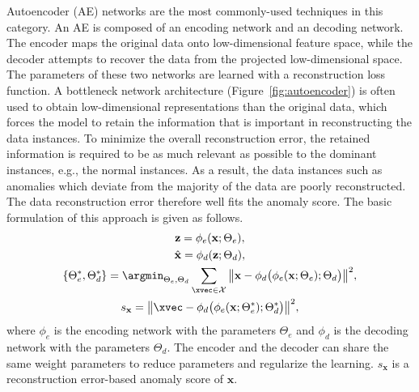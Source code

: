 Autoencoder (AE) networks are the most commonly-used techniques in this category. An AE is composed of an encoding network and an decoding network. The encoder maps the original data onto low-dimensional feature space, while the decoder attempts to recover the data from the projected low-dimensional space. The parameters of these two networks are learned with a reconstruction loss function. A bottleneck network architecture (Figure~\ref{fig:autoencoder}) is often used to obtain low-dimensional representations than the original data, which forces the model to retain the information that is important in reconstructing the data instances. To minimize the overall reconstruction error, the retained information is required to be as much relevant as possible to the dominant instances, e.g., the normal instances. As a result, the data instances such as anomalies which deviate from the majority of the data are poorly reconstructed. The data reconstruction error therefore well fits the anomaly score. The basic formulation of this approach is given as follows.
\begin{gather}\label{eqn:ae}
    \mathbf{z} = \phi_e(\mathbf{x}; \Theta_e),\\
    \hat{\mathbf{x}} = \phi_d(\mathbf{z}; \Theta_d),\\
   \{\Theta_e^*, \Theta_d^*\} = \argmin_{\Theta_e,\Theta_d} \sum_{\xvec \in \mathcal{X}}\big\|\mathbf{x}-\phi_d\big(\phi_e(\mathbf{x};\Theta_e); \Theta_d\big)\big\|^2,\\
    s_{\mathbf{x}} = \big\|\xvec - \phi_d\big(\phi_e(\mathbf{x};\Theta_e^*); \Theta_d^*\big)\big\|^2,
\end{gather}
where $\phi_e$ is the encoding network with the parameters $\Theta_e$ and $\phi_d$ is the decoding network with the parameters $\Theta_d$. The encoder and the decoder can share the same weight parameters to reduce parameters and regularize the learning. $s_{\mathbf{x}}$ is a reconstruction error-based anomaly score of $\mathbf{x}$.


